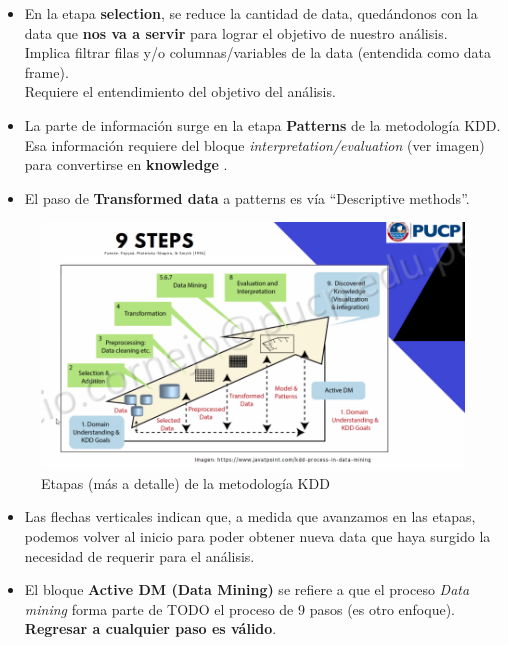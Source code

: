 \documentclass[
]{book}
\begin{document}
\begin{itemize}
\item
  En la etapa \textbf{selection}, se reduce la cantidad de data,
  quedándonos con la data que \textbf{nos va a servir} para lograr
  el objetivo de nuestro análisis.\\
  Implica filtrar filas y/o columnas/variables de la data
  (entendida como data frame).\\
  Requiere el entendimiento del objetivo del análisis.
\item
  La parte de información surge en la etapa
  \textbf{Patterns} de la metodología KDD.
  Esa información requiere del bloque
  \emph{interpretation/evaluation} (ver imagen)
  para convertirse en \textbf{knowledge} .
\item
  El paso de \textbf{Transformed data} a
  patterns es vía ``Descriptive methods''.
\end{itemize}

\begin{figure}

{\centering \includegraphics[width=12.69in]{images/etapas-metodologia-kdd-2} 

}

\caption{Etapas (más a detalle) de la metodología KDD}\label{fig:etapas-kdd-2}
\end{figure}

\begin{itemize}
\item
  Las flechas verticales indican que, a medida que avanzamos
  en las etapas, podemos volver al inicio para poder obtener
  nueva data que haya surgido la necesidad de requerir
  para el análisis.
\item
  El bloque \textbf{Active DM (Data Mining)}
  se refiere a que el proceso \emph{Data mining}
  forma parte de TODO el proceso de 9 pasos
  (es otro enfoque).\\
  \textbf{Regresar a cualquier paso es válido}.
\end{itemize}
\end{document}
